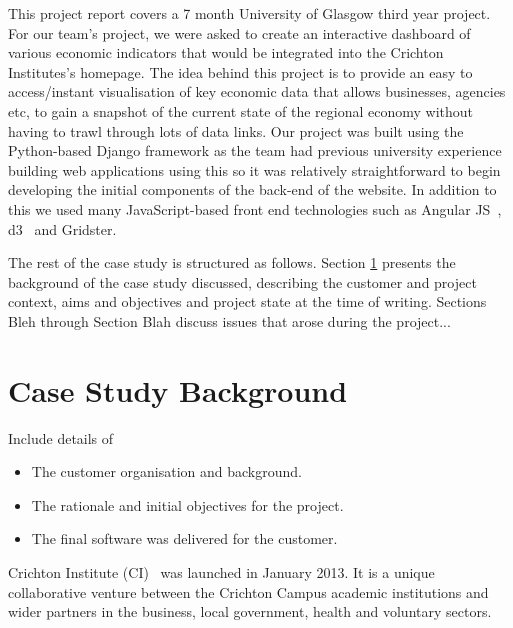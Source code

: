 \documentclass{l3proj}
\begin{document}
This project report covers a 7 month University of Glasgow third year project. For 
our team's project, we were asked to create an interactive dashboard of various 
economic indicators that would be integrated into the Crichton Institutes's homepage. The idea behind this project is to provide an easy to access/instant
visualisation of key economic data that allows businesses, agencies etc, to gain a snapshot of the current state of the
regional economy without having to trawl through lots of data links. Our project was built using the Python-based Django
framework as the team had previous university experience building web applications using this so it was relatively
straightforward to begin developing the initial components of the back-end of the website. In addition to this we used
many JavaScript-based front end technologies such as Angular JS~\cite{AngularWebpage}, d3~\cite{d3Webpage} and Gridster.




The rest of the case study is structured as follows.  Section
\ref{sec:background} presents the background of the case study
discussed, describing the customer and project context, aims and
objectives and project state at the time of writing.  Sections
Bleh through Section Blah discuss issues that
arose during the project...

\section{Case Study Background} \label{sec:background}

Include details of 

\begin{itemize}
\item The customer organisation and background.
\item The rationale and initial objectives for the project.
\item The final software was delivered for the customer.
\end{itemize}


Crichton Institute (CI)~\cite{CrichtonInstitute} was launched in January 2013. It is a unique collaborative venture between the Crichton Campus academic
institutions and wider partners in the business, local government, health and voluntary sectors.
\end{document}
